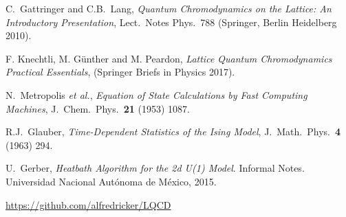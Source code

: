 \documentclass[12pt,a4paper]{article}
\begin{document}
\begin{thebibliography}{99}

 C.\ Gattringer and C.B.\ Lang, \emph{Quantum Chromodynamics on the Lattice: An Introductory Presentation},  Lect.\ Notes Phys.\ 788 (Springer, Berlin Heidelberg 2010).

 F. Knechtli, M. Günther and M. Peardon, \emph{Lattice Quantum Chromodynamics Practical Essentials}, 
(Springer Briefs in Physics 2017).

 N.\ Metropolis {\it et al.},
\emph{Equation of State Calculations by Fast Computing Machines},
J.\ Chem.\ Phys.\ {\bf 21} (1953) 1087.

 R.J.\ Glauber,
  \emph{Time-Dependent Statistics of the Ising Model},
  J.\ Math.\ Phys.\ {\bf 4} (1963) 294.
  
 U.\ Gerber,
  \emph{Heatbath Algorithm for the 2d U(1) Model}.
  Informal Notes. Universidad Nacional Autónoma de México, 2015.  
  
 \url{https://github.com/alfredricker/LQCD}

\end{thebibliography}
	
\end{document}
